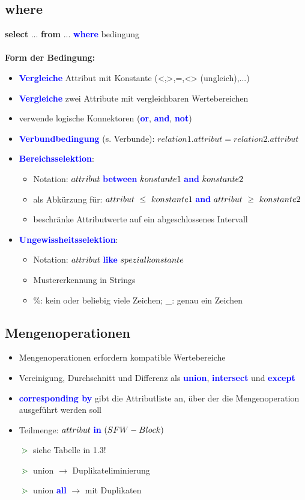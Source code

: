 \documentclass{scrartcl}
\newcommand{\key}[1]{{\textcolor{blue}{\textbf{#1}}}}
\newcommand{\hint}{{\textcolor{darkgreen}{\textbf{$\gtrdot$}}}}
\newcommand{\select}{\textbf{select }}
\newcommand{\from}{\textbf{from }}
\newcommand{\where}{\textbf{where }}
\begin{document}
\subsection{\where}

\select ... \from ...
\key{where} bedingung \\
\\
\textbf{Form der Bedingung:}
\begin{itemize}
	\itemsep0em
	\item \key{Vergleiche} Attribut mit Konstante (<,>,=,<> (ungleich),...)
	\item \key{Vergleiche} zwei Attribute mit vergleichbaren Wertebereichen
	\item verwende logische Konnektoren (\key{or}, \key{and}, \key{not})
	\item \key{Verbundbedingung} (s. Verbunde): $relation1.attribut = relation2.attribut$
	\item \key{Bereichsselektion}:  
	\begin{itemize}
		\item Notation: $attribut\ \key{between}\ konstante1\ \key{and}\ konstante2$
		\item als Abkürzung für: $attribut\ \leq\ konstante1\ \key{and}\ attribut\ \geq\ konstante2$
		\item beschränke Attributwerte auf ein abgeschlossenes Intervall
	\end{itemize}
	\item \key{Ungewissheitsselektion}:
	\begin{itemize}
		\item Notation: $attribut\ \key{like}\ spezialkonstante$
		\item Mustererkennung in Strings
		\item \%: kein oder beliebig viele Zeichen; \_: genau ein Zeichen
	\end{itemize}
\end{itemize}

\subsection{Mengenoperationen}

\begin{itemize}
	\itemsep0em
	\item Mengenoperationen erfordern kompatible Wertebereiche
	\item Vereinigung, Durchschnitt und Differenz als \key{union}, \key{intersect} und \key{except}
	\item \key{corresponding by} gibt die Attributliste an, über der die Mengenoperation ausgeführt werden soll
	\item Teilmenge: $attribut\ \key{in}\ (SFW-Block)$
	\item[\hint] siehe Tabelle in 1.3!
	\item[\hint] union $\rightarrow$ Duplikateliminierung
	\item[\hint] union \key{all} $\rightarrow$ mit Duplikaten
\end{itemize}
\end{document}
